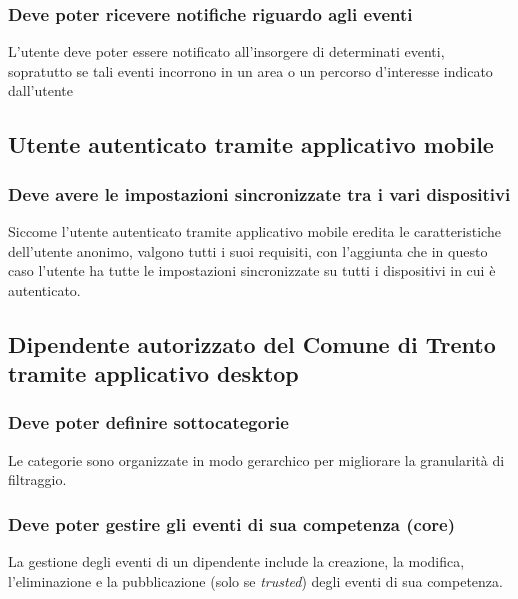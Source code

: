\documentclass{article}
\begin{document}
\subsubsection{Deve poter ricevere notifiche riguardo agli eventi}
\label{5.1.10}
L'utente deve poter essere notificato all'insorgere di determinati eventi, sopratutto se tali eventi incorrono in un area o un percorso d'interesse indicato dall'utente

\subsection{Utente autenticato tramite applicativo mobile}

\subsubsection{Deve avere le impostazioni sincronizzate tra i vari dispositivi}
\label{5.2.1}
Siccome l'utente autenticato tramite applicativo mobile eredita le caratteristiche dell'utente anonimo, valgono tutti i suoi requisiti, con l'aggiunta che in questo caso l'utente ha tutte le impostazioni sincronizzate su tutti i dispositivi in cui è autenticato.

\subsection{Dipendente autorizzato del Comune di Trento tramite applicativo desktop}

\subsubsection{Deve poter definire sottocategorie}
\label{5.3.1}
Le categorie sono organizzate in modo gerarchico per migliorare la granularità di filtraggio.

\subsubsection{Deve poter gestire gli eventi di sua competenza (core)}
\label{5.3.2}
La gestione degli eventi di un dipendente include la creazione, la modifica, l'eliminazione e la pubblicazione (solo se \textit{trusted}) degli eventi di sua competenza.
\end{document}
